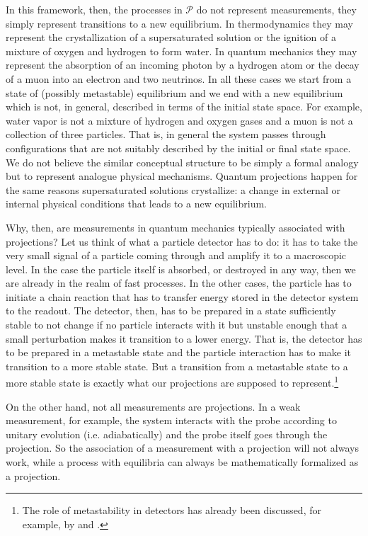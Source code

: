 \documentclass[applsci,article,submit,moreauthors,pdftex]{Definitions/mdpi}
\begin{document}
In this framework, then, the processes in $\mathcal{P}$ do not represent measurements, they simply represent transitions to a new equilibrium. In thermodynamics they may represent the crystallization of a supersaturated solution or the ignition of a mixture of oxygen and hydrogen to form water. In quantum mechanics they may represent the absorption of an incoming photon by a hydrogen atom or the decay of a muon into an electron and two neutrinos. In all these cases we start from a state of (possibly metastable) equilibrium and we end with a new equilibrium which is not, in general, described in terms of the initial state space. For example, water vapor is not a mixture of hydrogen and oxygen gases and a muon is not a collection of three particles. That is, in general the system passes through configurations that are not suitably described by the initial or final state space. We do not believe the similar conceptual structure to be simply a formal analogy but to represent analogue physical mechanisms. Quantum projections happen for the same reasons supersaturated solutions crystallize: a change in external or internal physical conditions that leads to a new equilibrium.

Why, then, are measurements in quantum mechanics typically associated with projections? Let us think of what a particle detector has to do: it has to take the very small signal of a particle coming through and amplify it to a macroscopic level. In the case the particle itself is absorbed, or destroyed in any way, then we are already in the realm of fast processes. In the other cases, the particle has to initiate a chain reaction that has to transfer energy stored in the detector system to the readout. The detector, then, has to be prepared in a state sufficiently stable to not change if no particle interacts with it but unstable enough that a small perturbation makes it transition to a lower energy. That is, the detector has to be prepared in a metastable state and the particle interaction has to make it transition to a more stable state. But a transition from a metastable state to a more stable state is exactly what our projections are supposed to represent.\footnote{The role of metastability in detectors has already been discussed, for example, by \cite{Daneri} and \cite{Merlin}.}

On the other hand, not all measurements are projections. In a weak measurement\cite{Tamir}, for example, the system interacts with the probe according to unitary evolution (i.e. adiabatically) and the probe itself goes through the projection. So the association of a measurement with a projection will not always work, while a process with equilibria can always be mathematically formalized as a projection.
\end{document}
